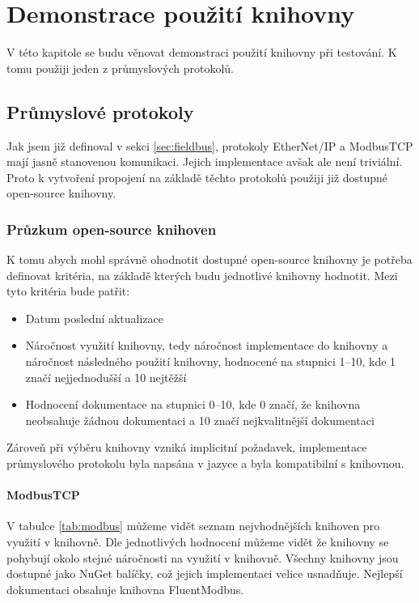 \chapter{Demonstrace použití knihovny}

V této kapitole se budu věnovat demonstraci použití knihovny při testování. K tomu použiji jeden z průmyslových protokolů.

\section{Průmyslové protokoly}
Jak jsem již definoval v sekci \ref{sec:fieldbus}, protokoly EtherNet/IP a ModbusTCP mají jasně stanovenou komunikaci. Jejich implementace avšak ale není triviální. Proto k vytvoření propojení na základě těchto protokolů použiji již dostupné open-source knihovny.  

\subsection{Průzkum open-source knihoven}
K tomu abych mohl správně ohodnotit dostupné open-source knihovny je potřeba definovat kritéria, na základě kterých budu jednotlivé knihovny hodnotit. Mezi tyto kritéria bude patřit:

\begin{itemize}
    \item Datum poslední aktualizace
    \item Náročnost využití knihovny, tedy náročnost implementace do knihovny a náročnost následného použití knihovny, hodnocené na stupnici 1--10, kde 1 značí nejjednodušší a 10 nejtěžší 
    \item Hodnocení dokumentace na stupnici 0--10, kde 0 značí, že knihovna neobsahuje žádnou dokumentaci a 10 značí nejkvalitnější dokumentaci
\end{itemize}

Zároveň při výběru knihovny vzniká implicitní požadavek, implementace průmyslového protokolu byla napsána v jazyce \csharp{} a byla kompatibilní s knihovnou.

\subsubsection{ModbusTCP}

V tabulce \ref{tab:modbus} můžeme vidět seznam nejvhodnějších knihoven pro využití v knihovně. Dle jednotlivých hodnocení můžeme vidět že knihovny se pohybují okolo stejné náročnosti na využití v knihovně. Všechny knihovny jsou dostupné jako NuGet balíčky, což jejich implementaci velice usnadňuje. Nejlepší dokumentaci obsahuje knihovna FluentModbus.


